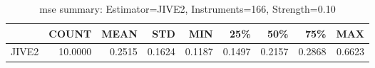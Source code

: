 \begin{table}[ht]
\centering
\caption{mse summary: Estimator=JIVE2, Instruments=166, Strength=0.10}
\begin{tabular}{lrrrrrrrr}
\toprule
 & COUNT & MEAN & STD & MIN & 25\% & 50\% & 75\% & MAX \\
\midrule
JIVE2 & 10.0000 & 0.2515 & 0.1624 & 0.1187 & 0.1497 & 0.2157 & 0.2868 & 0.6623 \\
\bottomrule
\end{tabular}
\end{table}

